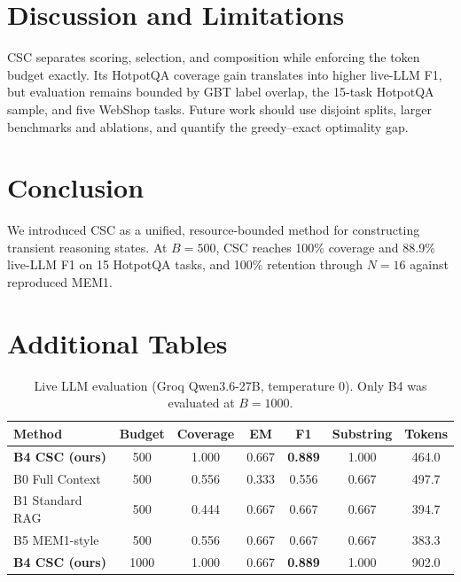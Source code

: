 \documentclass{article}
\begin{document}
\section{Discussion and Limitations}

CSC separates scoring, selection, and composition while enforcing the token budget exactly. Its HotpotQA coverage gain translates into higher live-LLM F1, but evaluation remains bounded by GBT label overlap, the 15-task HotpotQA sample, and five WebShop tasks. Future work should use disjoint splits, larger benchmarks and ablations, and quantify the greedy--exact optimality gap.

\section{Conclusion}

We introduced CSC as a unified, resource-bounded method for constructing transient reasoning states. At $B=500$, CSC reaches 100\% coverage and 88.9\% live-LLM F1 on 15 HotpotQA tasks, and 100\% retention through $N=16$ against reproduced MEM1.




\appendix

\section{Additional Tables}

\begin{table}[h]
\caption{Live LLM evaluation (Groq Qwen3.6-27B, temperature 0). Only B4 was evaluated at $B=1000$.}
\centering
\begin{tabular}{lcccccc}
\toprule
Method & Budget & Coverage & EM & F1 & Substring & Tokens \\
\midrule
\textbf{B4 CSC (ours)} & 500 & 1.000 & 0.667 & \textbf{0.889} & 1.000 & 464.0 \\
B0 Full Context & 500 & 0.556 & 0.333 & 0.556 & 0.667 & 497.7 \\
B1 Standard RAG & 500 & 0.444 & 0.667 & 0.667 & 0.667 & 394.7 \\
B5 MEM1-style & 500 & 0.556 & 0.667 & 0.667 & 0.667 & 383.3 \\
\textbf{B4 CSC (ours)} & 1000 & 1.000 & 0.667 & \textbf{0.889} & 1.000 & 902.0 \\
\bottomrule
\end{tabular}
\end{table}
\end{document}

